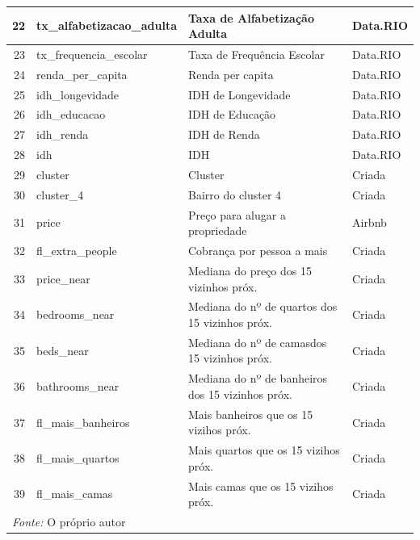 \documentclass[
	12pt,				%
	a4paper,		%
	oneside,    %
	chapter=TITLE,		   %
	section=TITLE,		   %
	subsection=TITLE,	   %
	subsubsection=TITLE, %
	english,			%
	french,				%
	spanish,			%
	brazil,				%
]{abntex2}
\begin{document}
\begin{table}
\begin{tabular}[t]{r|l|l|l}
\hline
22 & tx\_alfabetizacao\_adulta & Taxa de Alfabetização Adulta & Data.RIO\\
\hline
23 & tx\_frequencia\_escolar & Taxa de Frequência Escolar & Data.RIO\\
\hline
24 & renda\_per\_capita & Renda per capita & Data.RIO\\
\hline
25 & idh\_longevidade & IDH de Longevidade & Data.RIO\\
\hline
26 & idh\_educacao & IDH de Educação & Data.RIO\\
\hline
27 & idh\_renda & IDH de Renda & Data.RIO\\
\hline
28 & idh & IDH & Data.RIO\\
\hline
29 & cluster & Cluster & Criada\\
\hline
30 & cluster\_4 & Bairro do cluster 4 & Criada\\
\hline
31 & price & Preço para alugar a propriedade & Airbnb\\
\hline
32 & fl\_extra\_people & Cobrança por pessoa a mais & Criada\\
\hline
33 & price\_near & Mediana do preço dos 15 vizinhos próx. & Criada\\
\hline
34 & bedrooms\_near & Mediana do nº de quartos dos 15 vizinhos próx. & Criada\\
\hline
35 & beds\_near & Mediana do nº de camasdos 15 vizinhos próx. & Criada\\
\hline
36 & bathrooms\_near & Mediana do nº de banheiros dos 15 vizinhos próx. & Criada\\
\hline
37 & fl\_mais\_banheiros & Mais banheiros que os 15 vizihos próx. & Criada\\
\hline
38 & fl\_mais\_quartos & Mais quartos que os 15 vizihos próx. & Criada\\
\hline
39 & fl\_mais\_camas & Mais camas que os 15 vizihos próx. & Criada\\
\hline
\multicolumn{4}{l}{\textit{Fonte: } O próprio autor}\\
\end{tabular}
\end{table}
\end{document}
